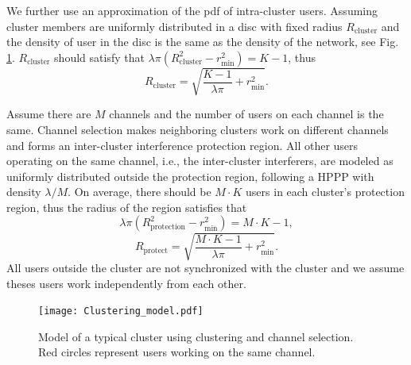 \documentclass[10pt, conference, letterpaper]{IEEEtran}
\begin{document}
We further use an approximation of the pdf of intra-cluster users. Assuming cluster members are uniformly distributed in a disc with fixed radius $R_{\mathrm{cluster}}$ and the density of user in the disc is the same as the density of the network, see Fig. \ref{fig:clusteranalysis:model}. $R_{\mathrm{cluster}}$ should satisfy that $\lambda \pi (R_{\mathrm{cluster}}^2 - r_{\min}^2) = K - 1$, thus 
\begin{equation*}
R_{\mathrm{cluster}} = \sqrt{\frac{K - 1}{\lambda\pi}+r_{\min}^2}.
\end{equation*}

Assume there are $M$ channels and the number of users on each channel is the same. Channel selection makes neighboring clusters work on different channels and forms an inter-cluster interference protection region. 
All other users operating on the same channel, i.e., the inter-cluster interferers, are modeled as uniformly distributed outside the protection region, following a HPPP with density $\lambda/M$. On average, there should be $M\cdot K$ users in each cluster's protection region, thus the radius of the region satisfies that 
\begin{equation*}
\lambda \pi (R_{\mathrm{protection}}^2 - r_{\min}^2) = M\cdot K - 1,
\end{equation*}
\begin{equation*}
R_{\mathrm{protect}} = \sqrt{\frac{M\cdot K - 1}{\lambda \pi} + r_{\min}^2}.
\end{equation*}
All users outside the cluster are not synchronized with the cluster and we assume theses users work independently from each other.  

\begin{figure}
	\centering
	\texttt{[image: Clustering\_model.pdf]}
	\caption{Model of a typical cluster using clustering and channel selection. Red circles represent users working on the same channel.}
	\label{fig:clusteranalysis:model}
\end{figure}
\end{document}
